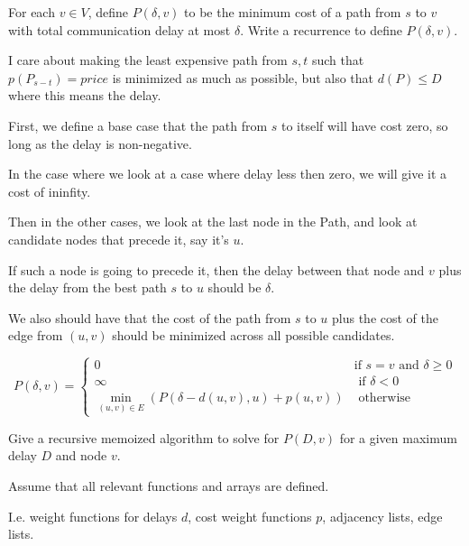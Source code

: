 \begin{questions}
	\question[5] For each $v \in V$, define
	$P(\delta,v)$ to be  the minimum cost of a path from $s$ to $v$ with total communication delay at most $\delta$. Write a recurrence to define $P(\delta, v)$.

	\ifsolutions\fi

	\begin{soln}
		I care about making the least expensive path from \(s, t\) such that \(p(P_{s-t}) = price\) is minimized as much as possible, but also that \(d(P) \leq D\) where this means the delay.

		First, we define a base case that the path from \(s\) to itself will have cost zero, so long as the delay is non-negative.

		In the case where we look at a case where delay less then zero, we will give it a cost of ininfity.

		Then in the other cases, we look at the last node in the Path, and look at candidate nodes that precede it, say it's \(u\).

		If such a node is going to precede it, then the delay between that node and \(v\) plus the delay from the best path \(s\) to \(u\) should be \(\delta\).

		We also should have that the cost of the path from \(s\) to \(u\) plus the cost of the edge from \((u, v)\) should be minimized across all possible candidates.

		\[
			P(\delta, v) = \begin{cases}
				0                                                      & \text{if } s = v \text{ and } \delta \geq 0 \\
				\infty                                                 & \text{ if } \delta < 0                      \\
				\min_{(u, v) \in E} (P(\delta - d(u, v), u) + p(u, v)) & \text{ otherwise }
			\end{cases}
		\]

	\end{soln}

	\question[7] Give a recursive memoized algorithm to solve for $P(D,v)$ for a given maximum delay $D$ and node $v$.

	\ifsolutions\fi

	\begin{soln}
		Assume that all relevant functions and arrays are defined.

		I.e. weight functions for delays \(d\), cost weight functions \(p\), adjacency lists, edge lists.


\end{soln}
\end{questions}
